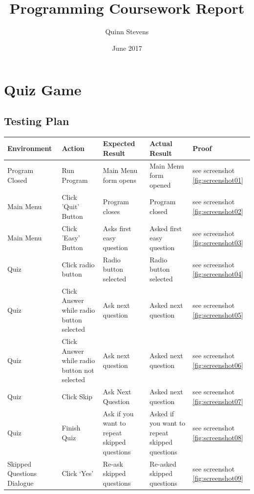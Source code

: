 \documentclass{report}
\title{Programming Coursework Report}
\author{Quinn Stevens}
\date{June 2017}
\begin{document}
\tabulinesep=1.2mm
\maketitle

\tableofcontents

    \part{Quiz Game}
    \chapter{Testing Plan}
    
    \begin{longtable}[c]{|p{}|p{}|p{}|p{}|p{}|}
    	\hline
        \textbf{Environment} & \textbf{Action} & \textbf{Expected Result} & \textbf{Actual Result} & \textbf{Proof}\\
        \hline
        Program Closed & Run Program & Main Menu form opens & Main Menu form opened & see screenshot \ref{fig:screenshot01}\\
        \hline
        Main Menu & Click 'Quit' Button & Program closes & Program closed & see screenshot \ref{fig:screenshot02}\\
        \hline
        Main Menu & Click 'Easy' Button & Asks first easy question & Asked first easy question & see screenshot \ref{fig:screenshot03}\\
        \hline
        Quiz & Click radio button & Radio button selected & Radio button selected & see screenshot \ref{fig:screenshot04}\\
        \hline
        Quiz & Click Answer while radio button selected & Ask next question & Asked next question & see screenshot \ref{fig:screenshot05} \\
        \hline
        Quiz & Click Answer while radio button not selected & Ask next question & Asked next question & see screenshot \ref{fig:screenshot06} \\
        \hline
        Quiz & Click Skip & Ask Next Question & Asked next question & see screenshot \ref{fig:screenshot07}\\
        \hline
        Quiz & Finish Quiz & Ask if you want to repeat skipped questions & Asked if you want to repeat skipped questions & see screenshot \ref{fig:screenshot08}\\
        \hline
        Skipped Questions Dialogue & Click `Yes' & Re-ask skipped questions & Re-asked skipped questions & see screenshot \ref{fig:screenshot09}\\

\end{longtable}
\end{document}
